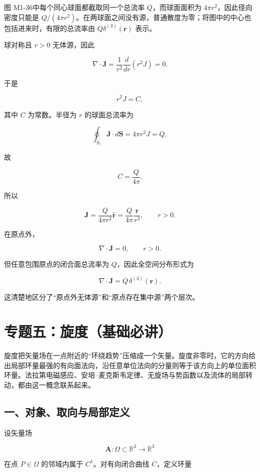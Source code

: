 图 M1-36中每个同心球面都截取同一个总流率 \(Q\)，而球面面积为
\(4\pi r^2\)，因此径向密度只能是
\(Q/(4\pi r^2)\)。在两球面之间没有源，普通散度为零；将图中的中心也包括进来时，有限的总流率由
\(Q\delta^{(3)}(\mathbf r)\) 表示。

球对称且 \(r>0\) 无体源，因此

\[
\nabla\cdot\mathbf J
=\frac1{r^2}\frac{d}{dr}(r^2J)=0.
\]

于是

\[
r^2J=C,
\]

其中 \(C\) 为常数。半径为 \(r\) 的球面总流率为

\[
\oint_{S_r}\mathbf J\cdot d\mathbf S
=4\pi r^2J=Q,
\]

故

\[
C=\frac Q{4\pi}.
\]

所以

\[
\boxed{
\mathbf J
=\frac Q{4\pi r^2}\hat{\mathbf r}
=\frac Q{4\pi}\frac{\mathbf r}{r^3}
},
\qquad r>0.
\]

在原点外，

\[
\boxed{\nabla\cdot\mathbf J=0},
\qquad r>0.
\]

但任意包围原点的闭合面总流率为 \(Q\)，因此全空间分布形式为

\[
\boxed{
\nabla\cdot\mathbf J
=Q\,\delta^{(3)}(\mathbf r)
}.
\]

这清楚地区分了``原点外无体源''和``原点存在集中源''两个层次。

\section{专题五：旋度（基础必讲）}\label{m1:ux4e13ux9898ux4e94ux65cbux5ea6ux57faux7840ux5fc5ux8bb2}

旋度把矢量场在一点附近的``环绕趋势''压缩成一个矢量。旋度非零时，它的方向给出局部环量最强的有向面法向，沿任意单位法向的分量则等于该方向上的单位面积环量。法拉第电磁感应、安培--麦克斯韦定律、无旋场与势函数以及流体的局部转动，都由这一概念联系起来。

\subsection{一、对象、取向与局部定义}\label{m1:ux4e00ux5bf9ux8c61ux53d6ux5411ux4e0eux5c40ux90e8ux5b9aux4e49}

设矢量场

\[
\mathbf A:\Omega\subset\mathbb R^3\longrightarrow\mathbb R^3
\]

在点 \(P\in\Omega\) 的邻域内属于 \(C^1\)。对有向闭合曲线 \(C\)，定义环量

